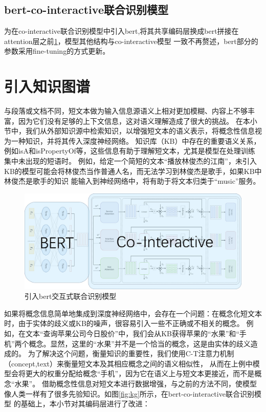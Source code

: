 \subsection{bert-co-interactive联合识别模型}

为在co-interactive联合识别模型中引入bert,将其共享编码层换成bert拼接在attention层之前\ref{fig:bert-joint}，模型其他结构与co-interactive模型
一致不再赘述，bert部分的参数采用fine-tuning的方式更新。


\section{引入知识图谱}
与段落或文档不同，短文本做为输入信息源语义上相对更加模糊、内容上不够丰富，因为它们没有足够的上下文信息，这对语义理解造成了很大的挑战。
在本小节中，我们从外部知识源中检索知识，以增强短文本的语义表示，将概念性信息视为一种知识，并将其传入深度神经网络。
知识库（KB）中存在的重要语义关系，例如isA和isPropertyOf等，这些信息有助于理解短文本，尤其是模型在处理训练集中未出现的短语时。
例如，给定一个简短的文本“播放林俊杰的江南”，未引入KB的模型可能会将林俊杰当作普通人名，而无法学习到林俊杰是歌手，如果KB中林俊杰是歌手的知识
能输入到神经网络中，将有助于将文本归类于“music”服务。
\begin{figure}[htbp]
  \centering
  \includegraphics[width=14cm]{./images/bert-joint.jpg}
  \caption{引入bert交互式联合识别模型}
  \label{fig:bert-joint}
\end{figure}
如果将概念信息简单地集成到深度神经网络中，会存在一个问题：在概念化短文本时，由于实体的歧义或KB的噪声，很容易引入一些不正确或不相关的概念。
例如，在文本“查询苹果公司今日股价”中，我们会从KB获得苹果的“水果”和“手机”两个概念。显然，这里的“水果”并不是一个恰当的概念，这是由实体的歧义造成的。
为了解决这个问题，衡量知识的重要性，我们使用C-T注意力机制（concept,text）来衡量短文本及其相应概念之间的语义相似性，
从而在上例中模型会将更大的权重分配给概念“手机”，因为它在语义上与短文本更接近，而不是概念“水果”。
借助概念性信息对短文本进行数据增强，与之前的方法不同，使模型像人类一样有了很多先验知识。如图\ref{fig:kg}所示，在bert-co-interactive联合识别模型
的基础上，本小节对其编码层进行了改进：

